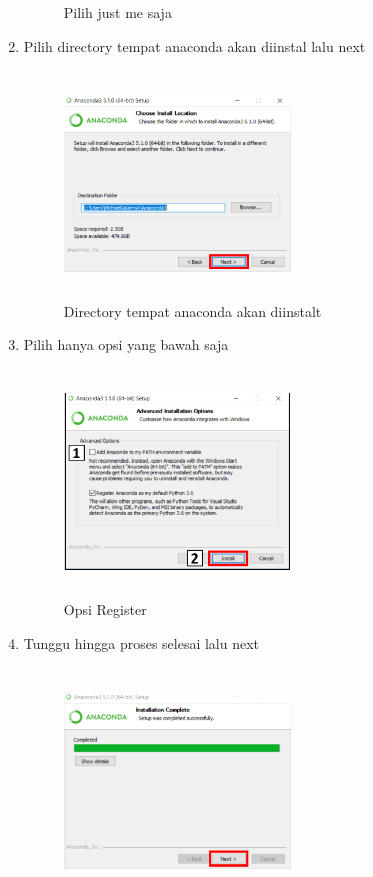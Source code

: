 \begin{enumerate}
\begin{figure}[H]
\caption{Pilih just me saja}
\label{akhir}
\end{figure}
\item Pilih directory tempat anaconda akan diinstal lalu next
\begin{figure}[H]
\centering
\includegraphics[width=6cm,height=6cm]{figures/4.png}
\caption{Directory tempat anaconda akan diinstalt}
\label{akhir}
\end{figure}
\item Pilih hanya opsi yang bawah saja
\begin{figure}[!htbp]
\centering
\includegraphics[width=6cm,height=6cm]{figures/5.png}
\caption{Opsi Register}
\label{akhir}
\end{figure}
\item Tunggu hingga proses selesai lalu next
\begin{figure}[H]
\centering
\includegraphics[width=6cm,height=6cm]{figures/6.png}

\end{figure}
\end{enumerate}
